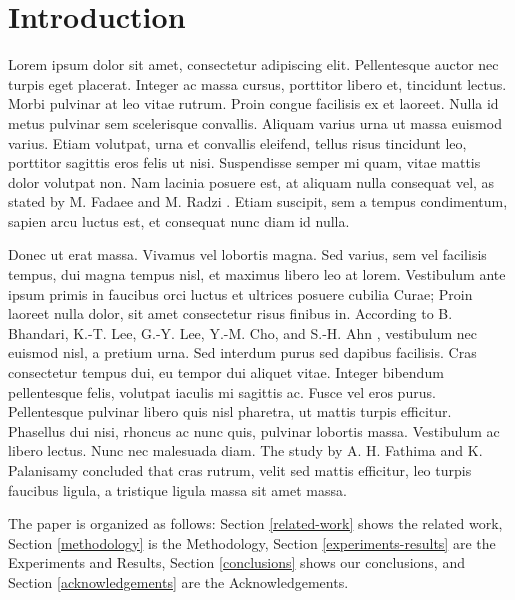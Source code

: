 \section{Introduction} \label{introduction}

Lorem ipsum dolor sit amet, consectetur adipiscing elit. Pellentesque auctor nec turpis eget placerat. Integer ac massa cursus, porttitor libero et, tincidunt lectus. Morbi pulvinar at leo vitae rutrum. Proin congue facilisis ex et laoreet. Nulla id metus pulvinar sem scelerisque convallis. Aliquam varius urna ut massa euismod varius. Etiam volutpat, urna et convallis eleifend, tellus risus tincidunt leo, porttitor sagittis eros felis ut nisi. Suspendisse semper mi quam, vitae mattis dolor volutpat non. Nam lacinia posuere est, at aliquam nulla consequat vel, as stated by  M. Fadaee and M. Radzi \cite{fadaee2012multi}. Etiam suscipit, sem a tempus condimentum, sapien arcu luctus est, et consequat nunc diam id nulla.

Donec ut erat massa. Vivamus vel lobortis magna. Sed varius, sem vel facilisis tempus, dui magna tempus nisl, et maximus libero leo at lorem. Vestibulum ante ipsum primis in faucibus orci luctus et ultrices posuere cubilia Curae; Proin laoreet nulla dolor, sit amet consectetur risus finibus in. According to B. Bhandari, K.-T. Lee, G.-Y. Lee, Y.-M. Cho, and S.-H. Ahn \cite{bhandari2015optimization}, vestibulum nec euismod nisl, a pretium urna. Sed interdum purus sed dapibus facilisis. Cras consectetur tempus dui, eu tempor dui aliquet vitae. Integer bibendum pellentesque felis, volutpat iaculis mi sagittis ac. Fusce vel eros purus. Pellentesque pulvinar libero quis nisl pharetra, ut mattis turpis efficitur. Phasellus dui nisi, rhoncus ac nunc quis, pulvinar lobortis massa. Vestibulum ac libero lectus. Nunc nec malesuada diam. The study by A. H. Fathima and K. Palanisamy \cite{fathima2015optimization} concluded that cras rutrum, velit sed mattis efficitur, leo turpis faucibus ligula, a tristique ligula massa sit amet massa.

The paper is organized as follows: Section \ref{related-work} shows the related work, Section \ref{methodology} is the Methodology, Section \ref{experiments-results} are the Experiments and Results, Section \ref{conclusions} shows our conclusions, and Section \ref{acknowledgements} are the Acknowledgements.

